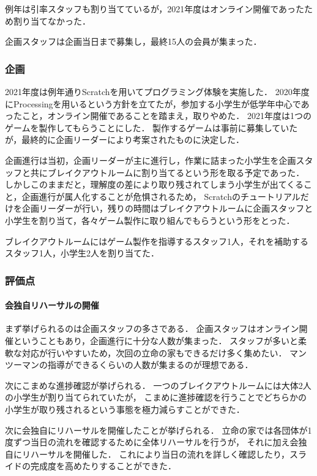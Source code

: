 例年は引率スタッフも割り当てているが，2021年度はオンライン開催であったため割り当てなかった．

企画スタッフは企画当日まで募集し，最終15人の会員が集まった．

\subsubsection*{企画}
2021年度は例年通りScratchを用いてプログラミング体験を実施した．
2020年度にProcessingを用いるという方針を立てたが，参加する小学生が低学年中心であったこと，オンライン開催であることを踏まえ，取りやめた．
2021年度は1つのゲームを製作してもらうことにした．
製作するゲームは事前に募集していたが，最終的に企画リーダーにより考案されたものに決定した．

企画進行は当初，企画リーダーが主に進行し，作業に詰まった小学生を企画スタッフと共にブレイクアウトルームに割り当てるという形を取る予定であった．
しかしこのままだと，理解度の差により取り残されてしまう小学生が出てくること，企画進行が属人化することが危惧されるため，
Scratchのチュートリアルだけを企画リーダーが行い，残りの時間はブレイクアウトルームに企画スタッフと小学生を割り当て，各々ゲーム製作に取り組んでもらうという形をとった．

ブレイクアウトルームにはゲーム製作を指導するスタッフ1人，それを補助するスタッフ1人，小学生2人を割り当てた．

\subsubsection*{評価点}
\paragraph{会独自リハーサルの開催}
まず挙げられるのは企画スタッフの多さである．
企画スタッフはオンライン開催ということもあり，企画進行に十分な人数が集まった．
スタッフが多いと柔軟な対応が行いやすいため，次回の立命の家もできるだけ多く集めたい．
マンツーマンの指導ができるくらいの人数が集まるのが理想である．

次にこまめな進捗確認が挙げられる．
一つのブレイクアウトルームには大体2人の小学生が割り当てられていたが，
こまめに進捗確認を行うことでどちらかの小学生が取り残されるという事態を極力減らすことができた．

次に会独自にリハーサルを開催したことが挙げられる．
立命の家では各団体が1度ずつ当日の流れを確認するために全体リハーサルを行うが，
それに加え会独自にリハーサルを開催した．
これにより当日の流れを詳しく確認したり，スライドの完成度を高めたりすることができた．


